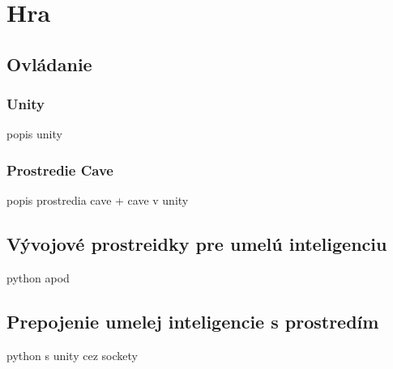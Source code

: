 \documentclass[12pt]{article}
\begin{document}
    
    
    
    
    
    \section{Hra}\label{sec:game}
    \subsection{Ovládanie}\label{subsec:controlling}
    \subsubsection{Unity}
    popis unity
    \subsubsection{Prostredie Cave}
    popis prostredia cave + cave v unity
    \subsection{Vývojové prostreidky pre umelú inteligenciu}\label{subsec:dev-tools-for-ai}
    python apod
    \subsection{Prepojenie umelej inteligencie s prostredím}\label{subsec:connection}
    python s unity cez sockety

    
    
\end{document}
